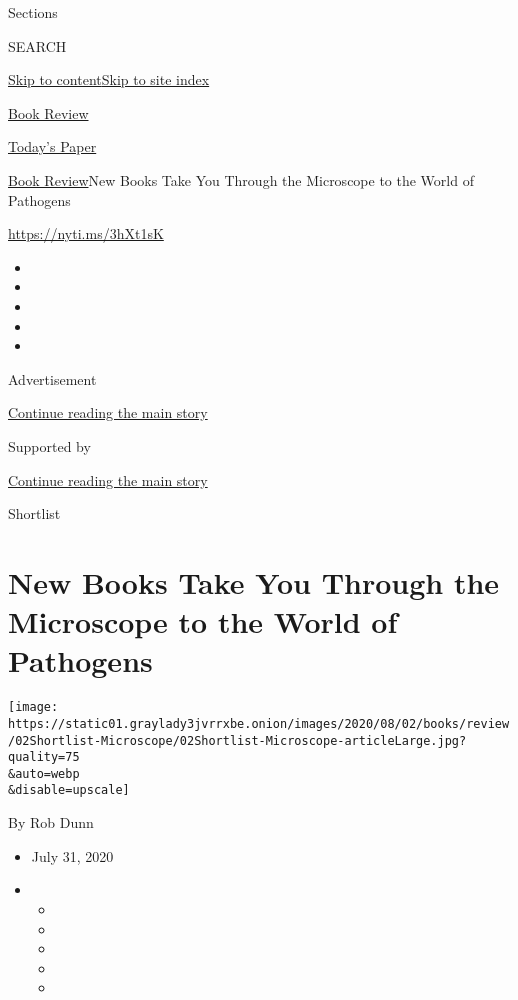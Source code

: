 Sections

SEARCH

\protect\hyperlink{site-content}{Skip to
content}\protect\hyperlink{site-index}{Skip to site index}

\href{https://www.nytimes3xbfgragh.onion/section/books/review}{Book
Review}

\href{https://myaccount.nytimes3xbfgragh.onion/auth/login?response_type=cookie\&client_id=vi}{}

\href{https://www.nytimes3xbfgragh.onion/section/todayspaper}{Today's
Paper}

\href{/section/books/review}{Book Review}\textbar{}New Books Take You
Through the Microscope to the World of Pathogens

\url{https://nyti.ms/3hXt1sK}

\begin{itemize}
\item
\item
\item
\item
\item
\end{itemize}

Advertisement

\protect\hyperlink{after-top}{Continue reading the main story}

Supported by

\protect\hyperlink{after-sponsor}{Continue reading the main story}

Shortlist

\hypertarget{new-books-take-you-through-the-microscope-to-the-world-of-pathogens}{%
\section{New Books Take You Through the Microscope to the World of
Pathogens}\label{new-books-take-you-through-the-microscope-to-the-world-of-pathogens}}

\texttt{[image: https://static01.graylady3jvrrxbe.onion/images/2020/08/02/books/review/02Shortlist-Microscope/02Shortlist-Microscope-articleLarge.jpg?quality=75\\\&auto=webp\\\&disable=upscale]}

By Rob Dunn

\begin{itemize}
\item
  July 31, 2020
\item
  \begin{itemize}
  \item
  \item
  \item
  \item
  \item
  \end{itemize}
\end{itemize}

